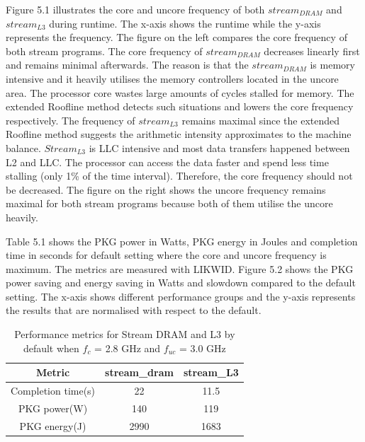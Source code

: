 Figure 5.1 illustrates the core and uncore frequency of both $stream_{DRAM}$ and $stream_{L3}$ during runtime. The x-axis shows the runtime while the y-axis represents the frequency. The figure on the left compares the core frequency of both stream programs. The core frequency of $stream_{DRAM}$ decreases linearly first and remains minimal afterwards. The reason is that the $stream_{DRAM}$ is memory intensive and it heavily utilises the memory controllers located in the uncore area. The processor core wastes large amounts of cycles stalled for memory. The extended Roofline method detects such situations and lowers the core frequency respectively. The frequency of  $stream_{L3}$ remains maximal since the extended Roofline method suggests the arithmetic intensity approximates to the machine balance. $Stream_{L3}$ is LLC intensive and most data transfers happened between L2 and LLC. The processor can access the data faster and spend less time stalling (only 1\% of the time interval). Therefore, the core frequency should not be decreased. The figure on the right shows the uncore frequency remains maximal for both stream programs because both of them utilise the uncore heavily.

	
Table 5.1 shows the PKG power in Watts, PKG energy in Joules and completion time in seconds for default setting where the core and uncore frequency is maximum. The metrics are measured with LIKWID. Figure 5.2 shows the PKG power saving and energy saving in Watts and slowdown compared to the default setting. The x-axis shows different performance groups and the y-axis represents the results that are normalised with respect to the default.

\begin{table} [h] %
	\centering      %
	\begin{tabular}{|c|c|c|} %
		\hline
		\textbf{Metric} & \textbf{stream\_dram} &\textbf{stream\_L3}  \\
		\hline
		Completion time(s)              & 22 &11.5       \\
		\hline
		PKG power(W)	              &  140& 119       \\
		\hline
		PKG energy(J)		 &   2990 &   1683  \\
		
		\hline
	\end{tabular}
	\caption{Performance metrics for Stream DRAM and L3 by default when $f_c$ = 2.8 GHz and $f_{uc}$ = 3.0 GHz}
\end{table}

